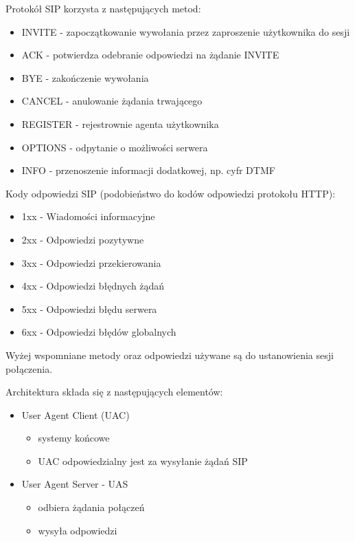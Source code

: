 Protokół SIP korzysta z następujących metod:

\begin{itemize}
	
	\item INVITE - zapoczątkowanie wywołania przez zaproszenie użytkownika do sesji
	\item ACK - potwierdza odebranie odpowiedzi na żądanie INVITE
	\item BYE - zakończenie wywołania
	\item CANCEL - anulowanie żądania trwającego
	\item REGISTER - rejestrownie agenta użytkownika
	\item OPTIONS - odpytanie o możliwości serwera
	\item INFO - przenoszenie informacji dodatkowej, np. cyfr DTMF
	
\end{itemize}

Kody odpowiedzi SIP (podobieństwo do kodów odpowiedzi protokołu HTTP):

\begin{itemize}
	
	\item 1xx - Wiadomości informacyjne
	\item 2xx - Odpowiedzi pozytywne
	\item 3xx - Odpowiedzi przekierowania
	\item 4xx - Odpowiedzi błędnych żądań
	\item 5xx - Odpowiedzi błędu serwera
	\item 6xx - Odpowiedzi błędów globalnych
	
\end{itemize}
Wyżej wspomniane metody oraz odpowiedzi używane są do ustanowienia sesji połączenia.


Architektura składa się z następujących elementów:

\begin{itemize}
	\item User Agent Client (UAC)
		\begin{itemize}
			\item systemy końcowe
			\item UAC odpowiedzialny jest za wysyłanie żądań SIP
		\end{itemize}
\end{itemize}

\begin{itemize}
	\item User Agent Server - UAS
	\begin{itemize}
		\item odbiera żądania połączeń
		\item wysyła odpowiedzi 
	\end{itemize}
\end{itemize}

